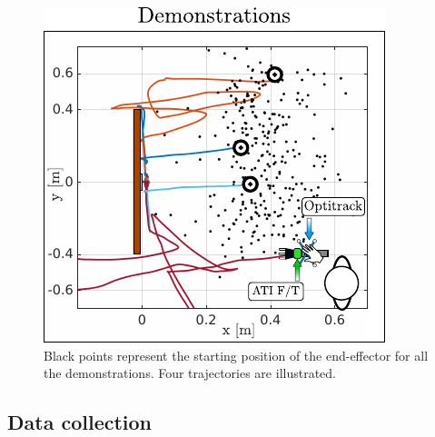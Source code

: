 \documentclass[final,5p,times,twocolumn]{elsarticle}
\begin{document}
\begin{figure}[h]
 \centering
   \includegraphics[width=0.9\linewidth]{./Figure/demonstrations.pdf}
   \caption{Black points represent the starting position of the end-effector
   for all the demonstrations. Four trajectories are illustrated.}
  \label{fig:experiment_demonstrations}
\end{figure}


\subsection{Data collection}
\end{document}

